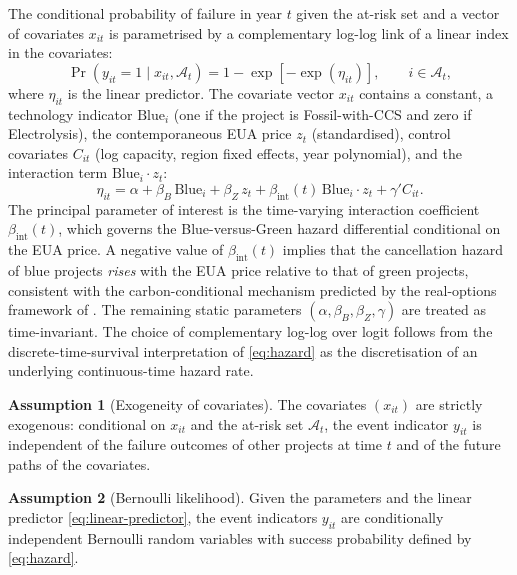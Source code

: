 \documentclass[12pt,a4paper]{article}
\newcommand{\bint}{\beta_{\text{int}}}
\theoremstyle{plain}
\theoremstyle{definition}
\newtheorem{assumption}{Assumption}
\begin{document}
The conditional probability of failure in year $t$ given the at-risk set and a vector of covariates $x_{it}$ is parametrised by a complementary log-log link of a linear index in the covariates:
\begin{equation}
\Pr(y_{it} = 1 \mid x_{it}, \mathcal{A}_t) = 1 - \exp\!\left[-\exp(\eta_{it})\right], \qquad i \in \mathcal{A}_t,
\label{eq:hazard}
\end{equation}
where $\eta_{it}$ is the linear predictor. The covariate vector $x_{it}$ contains a constant, a technology indicator $\text{Blue}_i$ (one if the project is Fossil-with-CCS and zero if Electrolysis), the contemporaneous EUA price $z_t$ (standardised), control covariates $C_{it}$ (log capacity, region fixed effects, year polynomial), and the interaction term $\text{Blue}_i \cdot z_t$:
\begin{equation}
\eta_{it} = \alpha + \beta_B \, \text{Blue}_i + \beta_Z \, z_t + \bint(t) \, \text{Blue}_i \cdot z_t + \gamma' C_{it}.
\label{eq:linear-predictor}
\end{equation}
The principal parameter of interest is the time-varying interaction coefficient $\bint(t)$, which governs the Blue-versus-Green hazard differential conditional on the EUA price. A negative value of $\bint(t)$ implies that the cancellation hazard of blue projects \emph{rises} with the EUA price relative to that of green projects, consistent with the carbon-conditional mechanism predicted by the real-options framework of \cite{dixit1994investment}. The remaining static parameters $(\alpha, \beta_B, \beta_Z, \gamma)$ are treated as time-invariant. The choice of complementary log-log over logit follows from the discrete-time-survival interpretation of \eqref{eq:hazard} as the discretisation of an underlying continuous-time hazard rate.

\begin{assumption}[Exogeneity of covariates]
\label{assn:exog}
The covariates $(x_{it})$ are strictly exogenous: conditional on $x_{it}$ and the at-risk set $\mathcal{A}_t$, the event indicator $y_{it}$ is independent of the failure outcomes of other projects at time $t$ and of the future paths of the covariates.
\end{assumption}

\begin{assumption}[Bernoulli likelihood]
\label{assn:bernoulli}
Given the parameters and the linear predictor \eqref{eq:linear-predictor}, the event indicators $y_{it}$ are conditionally independent Bernoulli random variables with success probability defined by \eqref{eq:hazard}.
\end{assumption}
\end{document}
